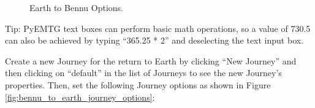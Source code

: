 \documentclass[11pt]{article}
\begin{document}
\begin{figure}
	\centering
	\caption{\label{fig:earth_to_bennu_journey_options}Earth to Bennu Options.}
\end{figure}

\noindent Tip: PyEMTG text boxes can perform basic math operations, so a value of 730.5 can also be achieved by typing ``365.25 * 2'' and deselecting the text input box.

\newpage

\noindent Create a new Journey for the return to Earth by clicking ``New Journey'' and then clicking on ``default'' in the list of Journeys to see the new Journey’s properties. Then, set the following Journey options as shown in Figure \ref{fig:bennu_to_earth_journey_options}:
\end{document}
